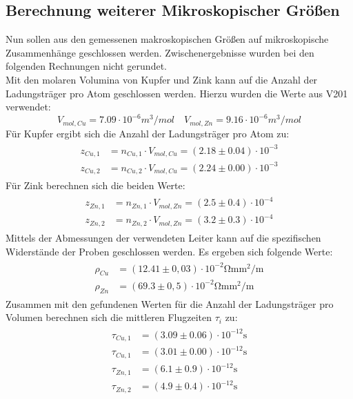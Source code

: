 \subsection{Berechnung weiterer Mikroskopischer Größen}
Nun sollen aus den gemessenen makroskopischen Größen auf mikroskopische Zusammenhänge geschlossen werden. Zwischenergebnisse
wurden bei den folgenden Rechnungen nicht gerundet. \\
Mit den molaren Volumina von Kupfer und Zink kann auf die Anzahl der Ladungsträger pro Atom
geschlossen werden. Hierzu wurden die Werte aus V201 \cite{anleitung201} verwendet:
\begin{equation}
  V_{mol, Cu} = 7.09 \cdot 10^{-6} \si{m^3 /mol} \quad   V_{mol, Zn} = 9.16 \cdot 10^{-6} \si{m^3 /mol}
\end{equation}
Für Kupfer ergibt sich die Anzahl der Ladungsträger pro Atom zu:
\begin{align}
  \begin{aligned}
    z_{Cu,1} &= n_{Cu,1} \cdot V_{mol, Cu} =  (2.18 \pm 0.04) \cdot 10^{-3}  \\
    z_{Cu,2} &= n_{Cu,2} \cdot V_{mol, Cu} =  (2.24 \pm 0.00) \cdot 10^{-3}
  \end{aligned}
\end{align}
Für Zink berechnen sich die beiden Werte:
\begin{align}
  \begin{aligned}
    z_{Zn,1} &= n_{Zn,1} \cdot V_{mol, Zn} =  (2.5\pm 0.4)\cdot 10^{-4}\\
    z_{Zn,2} &= n_{Zn,2} \cdot V_{mol, Zn} =   (3.2\pm 0.3)\cdot 10^{-4}
  \end{aligned}
\end{align}
Mittels der Abmessungen der verwendeten Leiter kann auf die spezifischen Widerstände der Proben geschlossen werden. Es ergeben sich folgende Werte:
\begin{align}
  \begin{aligned}
    \rho_{Cu} &=  (12.41 \pm 0,03)\cdot 10^{-2} \si{\ohm \milli \meter^2 \per \meter} \\
    \rho_{Zn} &=  (69.3 \pm 0,5) \cdot 10^{-2} \si{\ohm \milli \meter^2 \per \meter}
  \end{aligned}
\end{align}
Zusammen mit den gefundenen Werten für die Anzahl der Ladungsträger pro Volumen berechnen sich die mittleren Flugzeiten $\tau_i$ zu:
\begin{align}
  \begin{aligned}
    \tau_{Cu,1} &= (3.09 \pm 0.06) \cdot 10^{-12} \si{\second} \\
    \tau_{Cu,1} &= (3.01 \pm 0.00) \cdot 10^{-12} \si{\second} \\
    \tau_{Zn,1} &= (6.1 \pm 0.9) \cdot 10^{-12} \si{\second} \\
    \tau_{Zn,2} &= (4.9 \pm 0.4) \cdot 10^{-12} \si{\second}
  \end{aligned}
\end{align}
